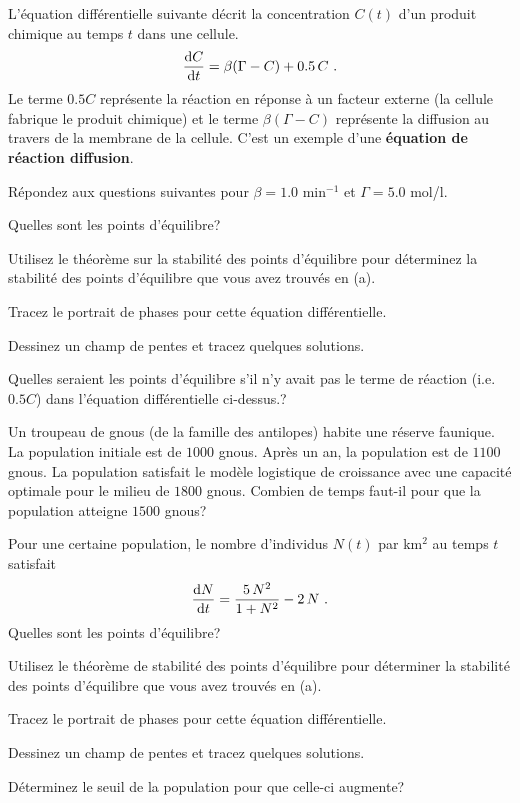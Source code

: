 \begin{question}[\life]
L'équation différentielle suivante décrit la concentration $C(t)$ d'un
produit chimique au temps $t$ dans une cellule.
\begin{equation}\label{reactdiff}
\frac{\mathrm{d}C}{\mathrm{d}t} = \beta(\Gamma-C) + 0.5\,C \ .
\end{equation}
Le terme $0.5 C$ représente la réaction en réponse à un facteur externe (la
cellule fabrique le produit chimique) et le terme $\beta(\Gamma -C)$
représente la diffusion au travers de la membrane de la cellule.  C'est un
exemple d'une
{\bfseries équation de réaction diffusion}.

Répondez aux questions suivantes pour $\beta = 1.0$ min$^{-1}$ et
$\Gamma = 5.0$ mol/l.

 Quelles sont les points d'équilibre?

 Utilisez le théorème sur la stabilité des points d'équilibre pour
déterminez la stabilité des points d'équilibre que vous avez trouvés en
(a).

 Tracez le portrait de phases pour cette équation différentielle.

 Dessinez un champ de pentes et tracez quelques solutions.

 Quelles seraient les points d'équilibre s'il n'y avait pas le terme
de réaction (i.e. $0.5C$) dans l'équation différentielle ci-dessus.?
\label{10Q49}
\end{question}

\begin{question}[\life]
Un troupeau de gnous (de la famille des antilopes) habite une réserve
faunique.  La population initiale est de $1000$ gnous.  Après un an, la
population est de $1100$ gnous.  La population satisfait le modèle
logistique de croissance avec une capacité optimale pour le milieu de $1800$
gnous.  Combien de temps faut-il pour que la population atteigne $1500$
gnous?
\label{10Q50}
\end{question}

\begin{question}[\life]
Pour une certaine population, le nombre d'individus $N(t)$ par km$^2$
au temps $t$ satisfait
\begin{equation} \label{q5_edo}
\frac{\mathrm{d}N}{\mathrm{d}t} = \frac{5\,N^2}{1+N^2} - 2\,N \ .
\end{equation}
 Quelles sont les points d'équilibre?

 Utilisez le théorème de stabilité des points d'équilibre pour
déterminer la stabilité des points d'équilibre que vous avez trouvés en
(a).

 Tracez le portrait de phases pour cette équation différentielle.

 Dessinez un champ de pentes et tracez quelques solutions.

 Déterminez le seuil de la population pour que celle-ci augmente?
\label{10Q51}
\end{question}

